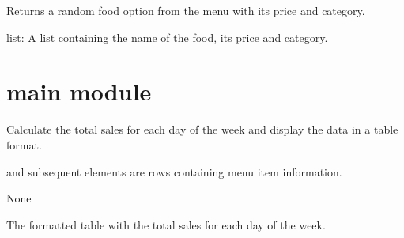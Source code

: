 \documentclass[letterpaper,10pt,english]{sphinxmanual}
\begin{document}

\begin{fulllineitems}
\label{\detokenize{generate_data:generate_data.fake_food}}
\pysigstartsignatures
{}
\pysigstopsignatures
\sphinxAtStartPar
Returns a random food option from the menu with its price and category.
\begin{description}
\sphinxAtStartPar
list: A list containing the name of the food, its price and category.

\end{description}

\end{fulllineitems}


\sphinxstepscope


\section{main module}
\label{\detokenize{main:module-main}}\label{\detokenize{main:main-module}}\label{\detokenize{main::doc}}

\begin{fulllineitems}
\label{\detokenize{main:main.cal_sales_day}}
\pysigstartsignatures
{}
\pysigstopsignatures
\sphinxAtStartPar
Calculate the total sales for each day of the week and display the data in a table format.
\begin{description}
\begin{description}
\sphinxAtStartPar
and subsequent elements are rows containing menu item information.

\end{description}

\sphinxAtStartPar
None

\sphinxAtStartPar
The formatted table with the total sales for each day of the week.

\end{description}

\end{fulllineitems}
\end{document}
